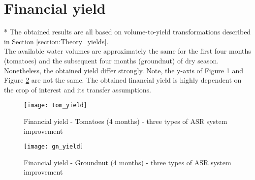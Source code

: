 \section{Financial yield}
\label{section:fin_yield}
* The obtained results are all based on volume-to-yield transformations described in Section \ref{section:Theory_yields}. \\

The available water volumes are approximately the same for the first four months (tomatoes) and the subsequent four months (groundnut) of dry season. Nonetheless, the obtained yield differ strongly. Note, the y-axis of Figure \ref{fig:tom_yield} and Figure \ref{fig:gn_yield} are not the same. The obtained financial yield is highly dependent on the crop of interest and its transfer assumptions. \\

 \begin{figure}[h!]
 \centering
 \texttt{[image: tom\_yield]}
 \captionsetup{justification=centering} 
 \caption{Financial yield - Tomatoes (4 months) - three types of ASR system improvement}
 \label{fig:tom_yield}
\end{figure}

\begin{figure}[H]
 \centering
 \texttt{[image: gn\_yield]}
 \captionsetup{justification=centering} 
 \caption{Financial yield - Groundnut (4 months) - three types of ASR system improvement}
 \label{fig:gn_yield}
\end{figure}

%
%
